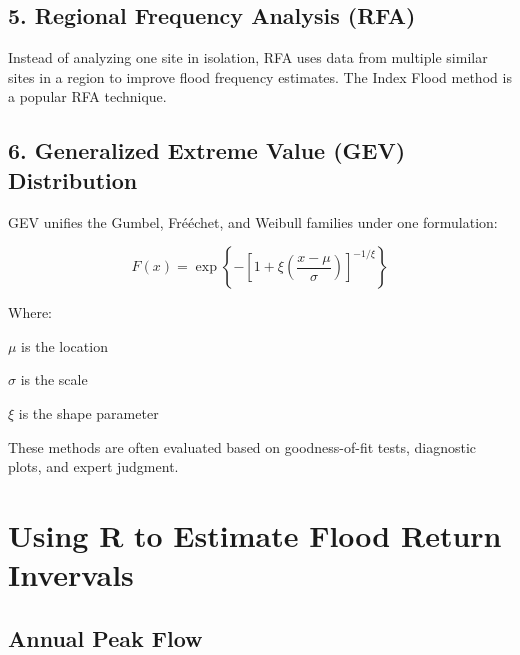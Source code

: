 \documentclass{tufte-handout}\usepackage[]{graphicx}\usepackage[]{xcolor}
\newenvironment{itemize*}%
  {\begin{itemize}%
    \setlength{\itemsep}{0pt}%
    \setlength{\parskip}{0pt}}%
  {\end{itemize}}
\begin{document}
\subsection{5. Regional Frequency Analysis (RFA)}

Instead of analyzing one site in isolation, RFA uses data from multiple similar sites in a region to improve flood frequency estimates. The Index Flood method is a popular RFA technique.

\subsection{6. Generalized Extreme Value (GEV) Distribution}

GEV unifies the Gumbel, Fr\'{e}échet, and Weibull families under one formulation:

\[
F(x) = \exp\left\{ -\left[ 1 + \xi \left(\frac{x - \mu}{\sigma} \right) \right]^{-1/\xi} \right\}
\]

Where:
\begin{itemize*}
  \item \( \mu \) is the location
  \item \( \sigma \) is the scale
  \item \( \xi \) is the shape parameter
\end{itemize*}


These methods are often evaluated based on goodness-of-fit tests, diagnostic plots, and expert judgment.

\section{Using R to Estimate Flood Return Invervals}

\subsection{Annual Peak Flow}
\end{document}
